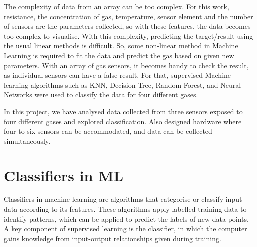 The complexity of data from an array can be too complex. For this work, resistance, the concentration of gas, temperature, sensor element and the number of sensors are the parameters collected, so with these features, the data becomes too complex to visualise. With this complexity, predicting the target/result using the usual linear methods is difficult. So, some non-linear method in Machine Learning is required to fit the data and predict the gas based on given new parameters. With an array of gas sensors, it becomes handy to check the result, as individual sensors can have a false result. For that, supervised Machine learning algorithms such as KNN, Decision Tree, Random Forest, and Neural Networks were used to classify the data for four different gases.

In this project, we have analysed data collected from three sensors exposed to four different gases and explored classification. Also designed hardware where four to six sensors can be accommodated, and data can be collected simultaneously.

\section{Classifiers in ML}
Classifiers in machine learning are algorithms that categorise or classify input data according to its features. These algorithms apply labelled training data to identify patterns, which can be applied to predict the labels of new data points. A key component of supervised learning is the classifier, in which the computer gains knowledge from input-output relationships given during training.

